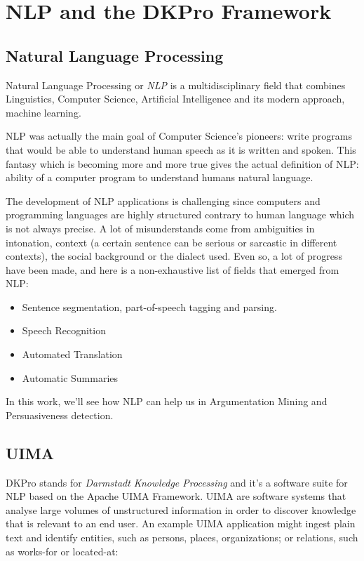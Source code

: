 \section{NLP and the DKPro Framework}
\subsection{Natural Language Processing}
Natural Language Processing or \emph{NLP} is a multidisciplinary field that combines Linguistics, Computer Science, Artificial Intelligence and its modern approach, \Gls{machine learning}.

NLP was actually the main goal of Computer Science's pioneers: write programs that would be able to understand human speech as it is written and spoken. This fantasy which is becoming more and more true gives the actual definition of NLP:  ability of a computer program to understand humans natural language. 

The development of NLP applications is challenging since computers and programming languages are highly structured contrary to human language which is not always precise. A lot of misunderstands come from ambiguities in intonation, context (a certain sentence can be serious or sarcastic in different contexts), the social background or the dialect used. Even so, a lot of progress have been made, and here is a non-exhaustive list of fields that emerged from NLP:
\begin{itemize}
  \item Sentence segmentation, part-of-speech tagging and parsing.  
  \item Speech Recognition
  \item Automated Translation
  \item Automatic Summaries
\end{itemize}

In this work, we'll see how NLP can help us in Argumentation Mining and Persuasiveness detection. 
 
\subsection{UIMA}
DKPro stands for \emph{Darmstadt Knowledge Processing}
\cite{GurevychEtal2007dkpro0} and it's a software suite for NLP based on the Apache UIMA Framework. UIMA are software systems that analyse large volumes of unstructured information in order to discover knowledge that is relevant to an end user. An example UIMA application might ingest plain text and identify entities, such as persons, places, organizations; or relations, such as works-for or located-at:

